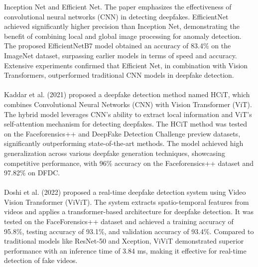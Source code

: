 Inception Net and Efficient Net. The paper emphasizes the effectiveness of convolutional neural networks (CNN) in detecting deepfakes. EfficientNet achieved significantly higher precision than Inception Net, demonstrating the benefit of combining local and global image processing for anomaly detection. The proposed EfficientNetB7 model obtained an accuracy of 83.4\% on the ImageNet dataset, surpassing earlier models in terms of speed and accuracy. Extensive
experiments confirmed that Efficient Net, in combination with Vision Transformers, outperformed traditional CNN models in deepfake detection.\\\\
Kaddar et al. (2021) proposed a deepfake detection method named HCiT, which combines Convolutional
Neural Networks (CNN) with Vision Transformer (ViT). The hybrid model leverages CNN's ability to extract local information and ViT's self-attention mechanism for detecting deepfakes. The HCiT method was tested on the Faceforensics++ and DeepFake Detection Challenge preview datasets, significantly outperforming state-of-the-art methods. The model achieved high generalization across various deepfake generation techniques, showcasing competitive performance, with 96\% accuracy on the Faceforensics++ dataset and 97.82\% on DFDC.\\\\

Doshi et al. (2022) proposed a real-time deepfake detection system using Video Vision Transformer
(ViViT). The system extracts spatio-temporal features from videos and applies a transformer-based architecture for deepfake detection. It was tested on the FaceForensics++ dataset and achieved a training accuracy of 95.8\%, testing accuracy of 93.1\%, and validation accuracy of 93.4\%. Compared to traditional models like ResNet-50 and Xception, ViViT demonstrated superior performance with an inference time of 3.84 ms, making it effective for real-time detection of fake videos.\\\\

